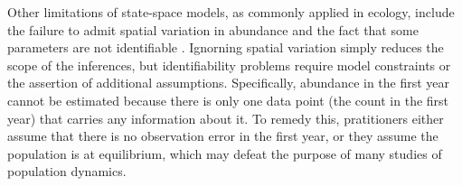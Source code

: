 \documentclass[12pt,english]{article}
\begin{document}
\begin{spacing}{1.9}
\begin{flushleft}
Other limitations of state-space models, as commonly applied in ecology,
include the failure to admit spatial variation in abundance and
the fact that some parameters are not identifiable
\citep{polansky_etal:2009}. 
Ignorning spatial variation simply reduces the scope of the
inferences, 
but identifiability problems require %
model constraints or the assertion of additional assumptions. 
Specifically, abundance in
the first year cannot be estimated because there is only one data
point (the count in the first year) that carries any information about
it. To remedy this, pratitioners either assume that there is no
observation error in the first year, or they assume the population is
at equilibrium, which may defeat the purpose of many studies of
population dynamics. 

\end{flushleft}
\end{spacing}
\end{document}
